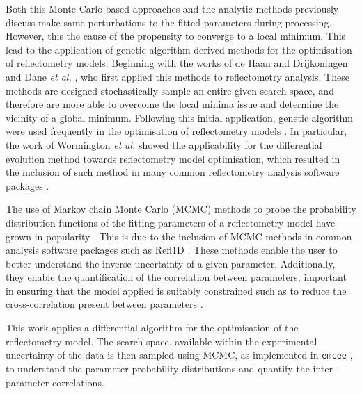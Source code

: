 Both this Monte Carlo based approaches and the analytic methods previously discuss make same perturbations to the fitted parameters during processing.
However, this the cause of the propensity to converge to a local minimum.
This lead to the application of genetic algorithm derived methods for the optimisation of reflectometry models.
Beginning with the works of de Haan and Drijkoningen \cite{de_haan_genetic_1994} and Dane \emph{et al.} \cite{dane_application_1998}, who first applied this methods to reflectometry analysis.
These methods are designed stochastically sample an entire given search-space, and therefore are more able to overcome the local minima issue and determine the vicinity of a global minimum.
Following this initial application, genetic algorithm were used frequently in the optimisation of reflectometry models \cite{ulyanenkov_genetic_2000,ulyanenkov_extended_2005,politsch_unbiased_2002,wormington_characterization_1999}.
In particular, the work of Wormington \emph{et al.} \cite{wormington_characterization_1999} showed the applicability for the differential evolution method towards reflectometry model optimisation, which resulted in the inclusion of such method in many common reflectometry analysis software packages \cite{bjorck_fitting_2011,bjorck_genx_2007,nelson_co-refinement_2006,nelson_refnx_2019,ott_simulreflec_2008,kienzle_ncnr_2006}.

The use of Markov chain Monte Carlo (MCMC) methods to probe the probability distribution functions of the fitting parameters of a reflectometry model have grown in popularity \cite{gil_limitations_2012,hoogerheide_structure_2018,owejan_solid_2012,heinrich_myristoylation_2014}.
This is due to the inclusion of MCMC methods in common analysis software packages such as Refl1D \cite{kienzle_ncnr_2006}.
These methods enable the user to better understand the inverse uncertainty of a given parameter.
Additionally, they enable the quantification of the correlation between parameters, important in ensuring that the model applied is suitably constrained such as to reduce the cross-correlation present between parameters \cite{nelson_co-refinement_2006}.

This work applies a differential algorithm \cite{storn_differential_1997,jones_scipy_2001} for the optimisation of the reflectometry model.
The search-space, available within the experimental uncertainty of the data is then sampled using MCMC, as implemented in \texttt{emcee} \cite{foreman-mackey_emcee_2013}, to understand the parameter probability distributions and quantify the inter-parameter correlations.

